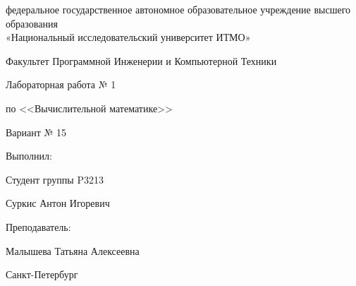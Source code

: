 \begin{titlepage}
    \begin{center}
        федеральное государственное автономное образовательное учреждение высшего образования\\
        «Национальный исследовательский университет ИТМО»

        \bigskip

        Факультет Программной Инженерии и Компьютерной Техники

        \vfill

        {\Large
        Лабораторная работа № 1

        по <<Вычислительной математике>>

        \bigskip

        Вариант № 15
        }
    \end{center}

    \bigskip

    \begin{flushright}
        Выполнил:

        Студент группы P3213

        Суркис Антон Игоревич

        \bigskip

        Преподаватель:

        Малышева Татьяна Алексеевна
    \end{flushright}

    \vfill

    \begin{center}
        Санкт-Петербург

        \the\year
    \end{center}


\end{titlepage}
